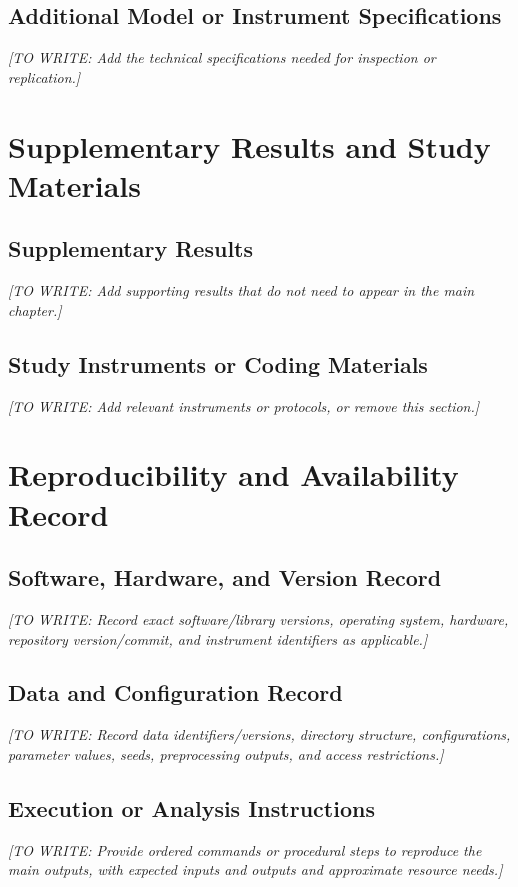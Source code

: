 \documentclass[12pt,a4paper,oneside]{report}
\newif\ifshowguidance
\newcommand{\Guide}[1]{%
  \ifshowguidance
  \begin{tcolorbox}[enhanced,breakable,colback=GuideBlue,
    colframe=GuideBorder,boxrule=0.5pt,arc=1mm,
    title={Writing guide --- replace with your research},
    colbacktitle=ThesisBlue,coltitle=white,fonttitle=\small\bfseries,
    before skip=10pt,after skip=10pt]
    \small #1
  \end{tcolorbox}
  \fi}
\newcommand{\Draft}[1]{\par\noindent\textit{[TO WRITE: #1]}\par}
\begin{document}
\section{Additional Model or Instrument Specifications}
\Draft{Add the technical specifications needed for inspection or replication.}

\chapter{Supplementary Results and Study Materials}
\label{app:supplement}
\Guide{Include additional tables, figures, questionnaires, interview guides,
coding frameworks, protocols, or case descriptions as relevant. Respect
permissions and confidentiality. Give each item a useful title and context;
reference it from the main text.}
\section{Supplementary Results}
\Draft{Add supporting results that do not need to appear in the main chapter.}
\section{Study Instruments or Coding Materials}
\Draft{Add relevant instruments or protocols, or remove this section.}

\chapter{Reproducibility and Availability Record}
\label{app:reproducibility}
\Guide{Use this appendix as a practical replication record. Include only
items relevant to the study. Do not publish passwords, private keys,
restricted personal data, or confidential material in configurations.}
\section{Software, Hardware, and Version Record}
\Draft{Record exact software/library versions, operating system, hardware,
repository version/commit, and instrument identifiers as applicable.}
\section{Data and Configuration Record}
\Draft{Record data identifiers/versions, directory structure, configurations,
parameter values, seeds, preprocessing outputs, and access restrictions.}
\section{Execution or Analysis Instructions}
\Draft{Provide ordered commands or procedural steps to reproduce the main
outputs, with expected inputs and outputs and approximate resource needs.}
\end{document}
